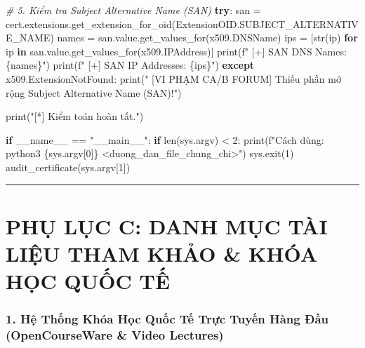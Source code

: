 \documentclass[
]{article}
\newenvironment{Shaded}{}{}
\newcommand{\BuiltInTok}[1]{\textcolor[rgb]{0.00,0.50,0.00}{#1}}
\newcommand{\CommentTok}[1]{\textcolor[rgb]{0.38,0.63,0.69}{\textit{#1}}}
\newcommand{\ControlFlowTok}[1]{\textcolor[rgb]{0.00,0.44,0.13}{\textbf{#1}}}
\newcommand{\DecValTok}[1]{\textcolor[rgb]{0.25,0.63,0.44}{#1}}
\newcommand{\KeywordTok}[1]{\textcolor[rgb]{0.00,0.44,0.13}{\textbf{#1}}}
\newcommand{\NormalTok}[1]{#1}
\newcommand{\OperatorTok}[1]{\textcolor[rgb]{0.40,0.40,0.40}{#1}}
\newcommand{\SpecialCharTok}[1]{\textcolor[rgb]{0.25,0.44,0.63}{#1}}
\newcommand{\SpecialStringTok}[1]{\textcolor[rgb]{0.73,0.40,0.53}{#1}}
\newcommand{\StringTok}[1]{\textcolor[rgb]{0.25,0.44,0.63}{#1}}
\newcommand{\VariableTok}[1]{\textcolor[rgb]{0.10,0.09,0.49}{#1}}
\begin{document}
\begin{Shaded}
\begin{Highlighting}[]
    \CommentTok{\# 5. Kiểm tra Subject Alternative Name (SAN)}
    \ControlFlowTok{try}\NormalTok{:}
\NormalTok{        san }\OperatorTok{=}\NormalTok{ cert.extensions.get\_extension\_for\_oid(ExtensionOID.SUBJECT\_ALTERNATIVE\_NAME)}
\NormalTok{        names }\OperatorTok{=}\NormalTok{ san.value.get\_values\_for(x509.DNSName)}
\NormalTok{        ips }\OperatorTok{=}\NormalTok{ [}\BuiltInTok{str}\NormalTok{(ip) }\ControlFlowTok{for}\NormalTok{ ip }\KeywordTok{in}\NormalTok{ san.value.get\_values\_for(x509.IPAddress)]}
        \BuiltInTok{print}\NormalTok{(}\SpecialStringTok{f" [+] SAN DNS Names: }\SpecialCharTok{\{}\NormalTok{names}\SpecialCharTok{\}}\SpecialStringTok{"}\NormalTok{)}
        \BuiltInTok{print}\NormalTok{(}\SpecialStringTok{f" [+] SAN IP Addresses: }\SpecialCharTok{\{}\NormalTok{ips}\SpecialCharTok{\}}\SpecialStringTok{"}\NormalTok{)}
    \ControlFlowTok{except}\NormalTok{ x509.ExtensionNotFound:}
        \BuiltInTok{print}\NormalTok{(}\StringTok{"  [VI PHẠM CA/B FORUM] Thiếu phần mở rộng Subject Alternative Name (SAN)!"}\NormalTok{)}

    \BuiltInTok{print}\NormalTok{(}\StringTok{"[*] Kiểm toán hoàn tất."}\NormalTok{)}

\ControlFlowTok{if} \VariableTok{\_\_name\_\_} \OperatorTok{==} \StringTok{"\_\_main\_\_"}\NormalTok{:}
    \ControlFlowTok{if} \BuiltInTok{len}\NormalTok{(sys.argv) }\OperatorTok{\textless{}} \DecValTok{2}\NormalTok{:}
        \BuiltInTok{print}\NormalTok{(}\SpecialStringTok{f"Cách dùng: python3 }\SpecialCharTok{\{}\NormalTok{sys}\SpecialCharTok{.}\NormalTok{argv[}\DecValTok{0}\NormalTok{]}\SpecialCharTok{\}}\SpecialStringTok{ \textless{}duong\_dan\_file\_chung\_chi\textgreater{}"}\NormalTok{)}
\NormalTok{        sys.exit(}\DecValTok{1}\NormalTok{)}
\NormalTok{    audit\_certificate(sys.argv[}\DecValTok{1}\NormalTok{])}
\end{Highlighting}
\end{Shaded}

\begin{center}\rule{0.5\linewidth}{0.5pt}\end{center}

\section{PHỤ LỤC C: DANH MỤC TÀI LIỆU THAM KHẢO \& KHÓA HỌC QUỐC
TẾ}\label{phux1ee5-lux1ee5c-c-danh-mux1ee5c-tuxe0i-liux1ec7u-tham-khux1ea3o-khuxf3a-hux1ecdc-quux1ed1c-tux1ebf}

\subsubsection{1. Hệ Thống Khóa Học Quốc Tế Trực Tuyến Hàng Đầu
(OpenCourseWare \& Video
Lectures)}\label{hux1ec7-thux1ed1ng-khuxf3a-hux1ecdc-quux1ed1c-tux1ebf-trux1ef1c-tuyux1ebfn-huxe0ng-ux111ux1ea7u-opencourseware-video-lectures}
\end{document}
